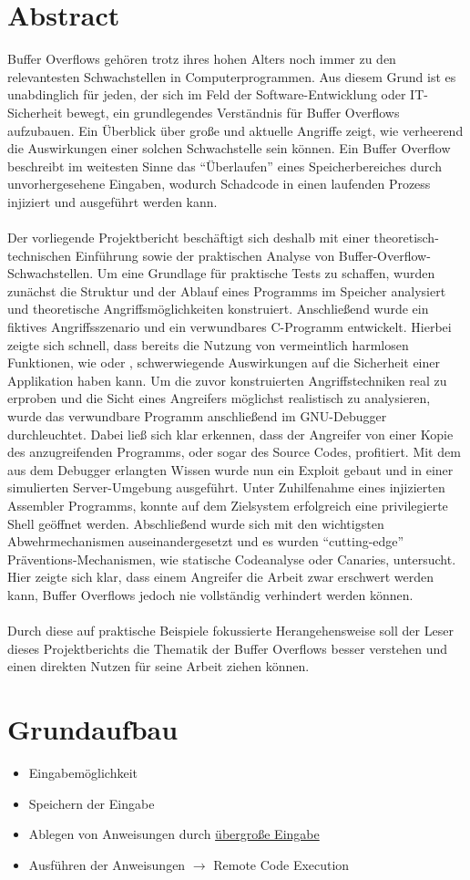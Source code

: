 \section{Abstract}
Buffer Overflows gehören trotz ihres hohen Alters noch immer zu den relevantesten Schwachstellen in Computerprogrammen.
Aus diesem Grund ist es unabdinglich für jeden, der sich im Feld der Software-Entwicklung oder IT-Sicherheit bewegt, 
ein grundlegendes Verständnis für Buffer Overflows aufzubauen. Ein Überblick über große und aktuelle Angriffe zeigt, 
wie verheerend die Auswirkungen einer solchen Schwachstelle sein können. Ein Buffer Overflow beschreibt im weitesten 
Sinne das “Überlaufen” eines Speicherbereiches durch unvorhergesehene Eingaben, wodurch Schadcode in einen laufenden 
Prozess injiziert und ausgeführt werden kann.\\ \\
Der vorliegende Projektbericht beschäftigt sich deshalb mit einer theoretisch-technischen Einführung sowie der praktischen 
Analyse von Buffer-Overflow-Schwachstellen. Um eine Grundlage für praktische Tests zu schaffen, wurden zunächst  
die Struktur und der Ablauf eines Programms im Speicher analysiert und theoretische Angriffsmöglichkeiten konstruiert.
Anschließend wurde ein fiktives Angriffsszenario und ein verwundbares C-Programm entwickelt. Hierbei zeigte sich schnell,
dass bereits die Nutzung von vermeintlich harmlosen Funktionen, wie  oder , schwerwiegende Auswirkungen
auf die Sicherheit einer Applikation haben kann. Um die zuvor konstruierten Angriffstechniken real zu erproben und die
Sicht eines Angreifers möglichst realistisch zu analysieren, wurde das verwundbare Programm anschließend im GNU-Debugger
durchleuchtet. Dabei ließ sich klar erkennen, dass der Angreifer von einer Kopie des anzugreifenden Programms, oder sogar
des Source Codes, profitiert. Mit dem aus dem Debugger erlangten Wissen wurde nun ein Exploit gebaut und in einer
simulierten Server-Umgebung ausgeführt. Unter Zuhilfenahme eines injizierten Assembler Programms, konnte auf dem
Zielsystem erfolgreich eine privilegierte Shell geöffnet werden.
Abschließend wurde sich mit den wichtigsten
Abwehrmechanismen auseinandergesetzt und es wurden “cutting-edge” Präventions-Mechanismen,
wie statische Codeanalyse oder Canaries, untersucht. Hier zeigte sich klar,
dass einem Angreifer die Arbeit zwar erschwert werden kann,
Buffer Overflows jedoch nie vollständig verhindert werden können.\\ \\
Durch diese auf praktische Beispiele fokussierte Herangehensweise soll der Leser dieses Projektberichts die Thematik
der Buffer Overflows besser verstehen und einen direkten Nutzen für seine Arbeit ziehen können.
\pagebreak

\section{Grundaufbau}
    \begin{itemize}
        \item Eingabemöglichkeit
        \item Speichern der Eingabe
        \item Ablegen von Anweisungen durch \underline{übergroße Eingabe}  
        \item Ausführen der Anweisungen $\rightarrow$ Remote Code Execution
    \end{itemize}
